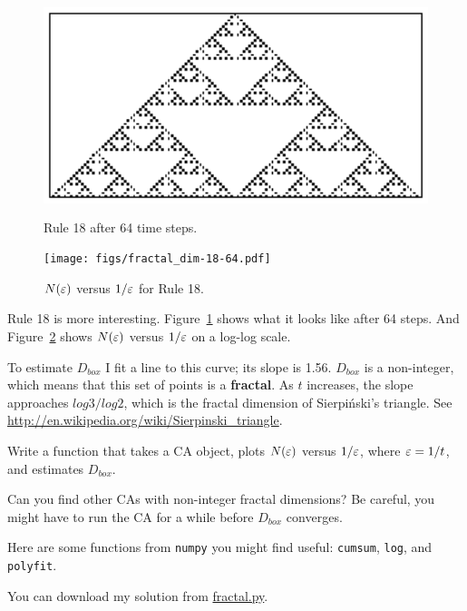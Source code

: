 \documentclass[10pt]{book}
\begin{document}
\begin{figure}
\centerline{\includegraphics[height=2.5in]{figs/rule-18-64.pdf}}
\caption{Rule 18 after 64 time steps.\label{fig.rule18.2}}
\end{figure}

\begin{figure}
\centerline{\texttt{[image: figs/fractal\_dim-18-64.pdf]}}
\caption{$N(\varepsilon)$ versus $1/\varepsilon$ for Rule 18.\label{fig.fractal}}
\end{figure}

Rule 18 is more interesting.  Figure~\ref{fig.rule18.2} shows what it
looks like after 64 steps.  And Figure~\ref{fig.fractal} shows
$N(\varepsilon)$ versus $1/\varepsilon$ on a log-log scale.  

To estimate $D_{box}$ I fit a line to this curve; its slope is 1.56.
$D_{box}$ is a non-integer, which means that this set of
points is a {\bf fractal}.  As $t$ increases, the slope approaches
$log 3 / log 2$, which is the fractal dimension of Sierpi\'{n}ski's
triangle.  See \url{http://en.wikipedia.org/wiki/Sierpinski_triangle}.

\begin{exercise}

Write a function that takes a CA object, plots $N(\varepsilon)$ versus
$1/\varepsilon$, where $\varepsilon = 1/t$, and estimates $D_{box}$.

Can you find other CAs with non-integer fractal dimensions?  Be
careful, you might have to run the CA for a while before
$D_{box}$ converges.

Here are some functions from {\tt numpy} you might find useful:
{\tt cumsum}, {\tt log}, and {\tt polyfit}.

You can download my solution from \url{fractal.py}.

\end{exercise}
\end{document}
